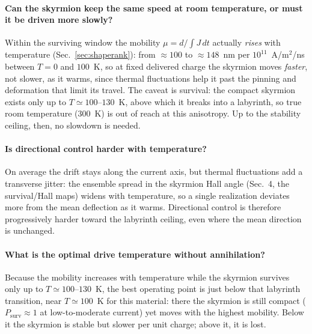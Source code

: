 \documentclass[11pt]{article}
\begin{document}
\paragraph{Can the skyrmion keep the same speed at room temperature, or
must it be driven more slowly?} Within the surviving window the
mobility $\mu = d/\!\int J\,dt$ actually \emph{rises} with temperature
(Sec.~\ref{sec:shaperank}): from $\approx100$ to $\approx148$~nm per
$10^{11}$~A/m$^2$/ns between $T=0$ and $100$~K, so at fixed delivered
charge the skyrmion moves \emph{faster}, not slower, as it warms, since
thermal fluctuations help it past the pinning and deformation that
limit its travel. The caveat is survival: the compact skyrmion exists
only up to $T\simeq100$--$130$~K, above which it breaks into a
labyrinth, so true room temperature ($300$~K) is out of reach at this
anisotropy. Up to the stability ceiling, then, no slowdown is needed.

\paragraph{Is directional control harder with temperature?} On average
the drift stays along the current axis, but thermal fluctuations add a
transverse jitter: the ensemble spread in the skyrmion Hall angle
(Sec.~4, the survival/Hall maps) widens with temperature, so a single
realization deviates more from the mean deflection as it warms.
Directional control is therefore progressively harder toward the
labyrinth ceiling, even where the mean direction is unchanged.

\paragraph{What is the optimal drive temperature without annihilation?}
Because the mobility increases with temperature while the skyrmion
survives only up to $T\simeq100$--$130$~K, the best operating point is
just below that labyrinth transition, near $T\simeq100$~K for this
material: there the skyrmion is still compact
($P_{\mathrm{surv}}\approx1$ at low-to-moderate current) yet moves with
the highest mobility. Below it the skyrmion is stable but slower per
unit charge; above it, it is lost.
\end{document}
